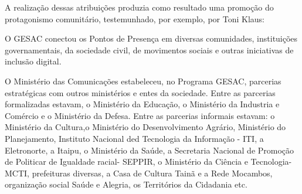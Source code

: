 \documentclass[
12pt,		%
openright,	%
twoside,  %
a4paper,			%
chapter=TITLE,		%
english,			%
french,				%
spanish,			%
brazil				%
]{USPSC-classe/USPSC}
\begin{document}
A realiza\c{c}\~ao dessas atribui\c{c}\~oes produzia como resultado uma promo\c{c}\~ao do protagonismo comunit\'ario, testemunhado, por exemplo, por Toni Klaus:


















\noindent\begin{center}\mbox{\centering{}}\end{center}


O GESAC conectou os Pontos de Presen\c{c}a em diversas comunidades, institui\c{c}\~oes governamentais, da sociedade civil, de movimentos sociais e outras iniciativas de inclus\~ao digital.

















O Minist\'erio das Comunica\c{c}\~oes estabeleceu, no Programa GESAC, parcerias estrat\'egicas com outros minist\'erios e entes da sociedade. Entre as parcerias formalizadas estavam, o Minist\'erio da Educa\c{c}\~ao, o Minist\'erio da Industria e Com\'ercio e o Minist\'erio da Defesa. Entre as parcerias informais estavam: o Minist\'erio da Cultura,o Minist\'erio do Desenvolvimento Agr\'ario, Minist\'erio do Planejamento, Instituto  Nacional ded Tecnologia da Informa\c{c}\~ao - ITI,  a Eletronorte, a Itaipu, o Minist\'erio da Sa\'ude, a Secretaria Nacional de Promo\c{c}\~ao de Politicar de Igualdade racial- SEPPIR, o Minist\'erio da Ci\^encia e Tecnologia-MCTI,  prefeituras diversas, a Casa de Cultura Tain\~a e a Rede Mocambos, organiza\c{c}\~ao social \textquotedbl Sa\'ude e Alegria\textquotedbl , os Territ\'orios da Cidadania etc.
\end{document}
